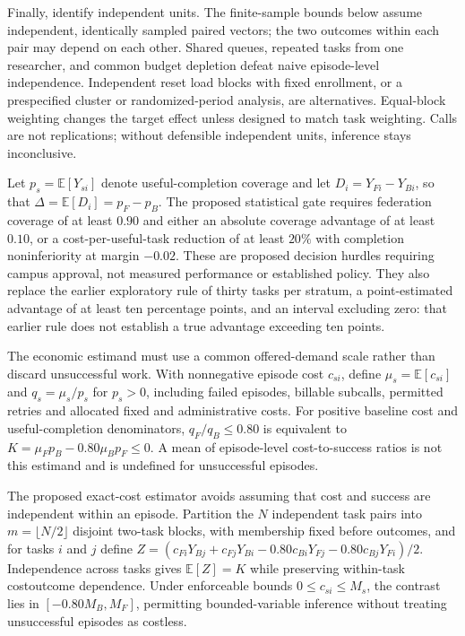 \documentclass[11pt]{article}
\begin{document}
Finally, identify independent units. The finite-sample bounds below assume independent, identically sampled paired vectors; the two outcomes within each pair may depend on each other. Shared queues, repeated tasks from one researcher, and common budget depletion defeat naive episode-level independence. Independent reset load blocks with fixed enrollment, or a prespecified cluster or randomized-period analysis, are alternatives. Equal-block weighting changes the target effect unless designed to match task weighting. Calls are not replications; without defensible independent units, inference stays inconclusive.

Let $p_s=\mathbb{E}[Y_{si}]$ denote useful-completion coverage and let $D_i=Y_{Fi}-Y_{Bi}$, so that $\Delta=\mathbb{E}[D_i]=p_F-p_B$. The proposed statistical gate requires federation coverage of at least $0.90$ and either an absolute coverage advantage of at least $0.10$, or a cost-per-useful-task reduction of at least $20\%$ with completion noninferiority at margin $-0.02$. These are proposed decision hurdles requiring campus approval, not measured performance or established policy. They also replace the earlier exploratory rule of thirty tasks per stratum, a point-estimated advantage of at least ten percentage points, and an interval excluding zero: that earlier rule does not establish a true advantage exceeding ten points.

The economic estimand must use a common offered-demand scale rather than discard unsuccessful work. With nonnegative episode cost $c_{si}$, define $\mu_s=\mathbb{E}[c_{si}]$ and $q_s=\mu_s/p_s$ for $p_s>0$, including failed episodes, billable subcalls, permitted retries and allocated fixed and administrative costs. For positive baseline cost and useful-completion denominators, $q_F/q_B\leq0.80$ is equivalent to $K=\mu_Fp_B-0.80\mu_Bp_F\leq0$. A mean of episode-level cost-to-success ratios is not this estimand and is undefined for unsuccessful episodes.

The proposed exact-cost estimator avoids assuming that cost and success are independent within an episode. Partition the $N$ independent task pairs into $m=\lfloor N/2\rfloor$ disjoint two-task blocks, with membership fixed before outcomes, and for tasks $i$ and $j$ define $Z=(c_{Fi}Y_{Bj}+c_{Fj}Y_{Bi}-0.80c_{Bi}Y_{Fj}-0.80c_{Bj}Y_{Fi})/2$. Independence across tasks gives $\mathbb{E}[Z]=K$ while preserving within-task cost\textendash{}\allowbreak{}outcome dependence. Under enforceable bounds $0\leq c_{si}\leq M_s$, the contrast lies in $[-0.80M_B,M_F]$, permitting bounded-variable inference without treating unsuccessful episodes as costless.
\end{document}

